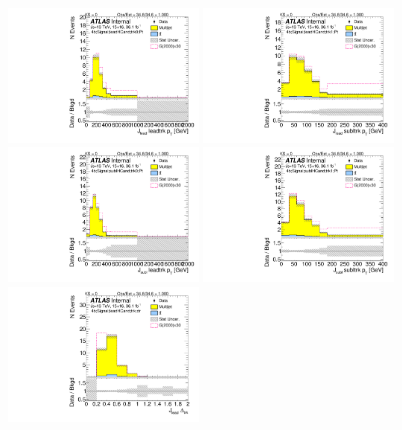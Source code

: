 \begin{figure}[htbp!]
\begin{center}
\includegraphics[width=0.45\textwidth,angle=-90]{figures/boosted/Signal/b77_FourTag_Signal_leadHCand_trk0_Pt_blind.pdf}
\includegraphics[width=0.45\textwidth,angle=-90]{figures/boosted/Signal/b77_FourTag_Signal_leadHCand_trk1_Pt_blind.pdf}\\
\includegraphics[width=0.45\textwidth,angle=-90]{figures/boosted/Signal/b77_FourTag_Signal_sublHCand_trk0_Pt_blind.pdf}
\includegraphics[width=0.45\textwidth,angle=-90]{figures/boosted/Signal/b77_FourTag_Signal_sublHCand_trk1_Pt_blind.pdf}\\
\includegraphics[width=0.45\textwidth,angle=-90]{figures/boosted/Signal/b77_FourTag_Signal_leadHCand_trk_dr_blind.pdf}

\end{center}
\end{figure}
